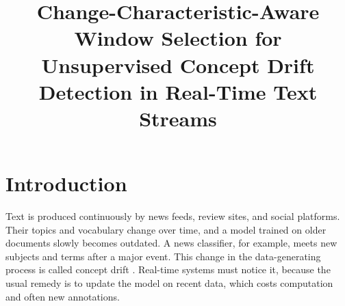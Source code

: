 \documentclass[conference]{IEEEtran}
\begin{document}
\title{Change-Characteristic-Aware Window Selection for Unsupervised Concept Drift Detection in Real-Time Text Streams}

\makeatletter
\newcommand{\linebreakand}{\end{@IEEEauthorhalign}\hfill\mbox{}\par\mbox{}\hfill\begin{@IEEEauthorhalign}}
\makeatother


\maketitle

\section{Introduction}

Text is produced continuously by news feeds, review sites, and social platforms. Their topics and vocabulary change over time, and a model trained on older documents slowly becomes outdated. A news classifier, for example, meets new subjects and terms after a major event. This change in the data-generating process is called concept drift \cite{gama2014,lu2019}. Real-time systems must notice it, because the usual remedy is to update the model on recent data, which costs computation and often new annotations.
\end{document}
